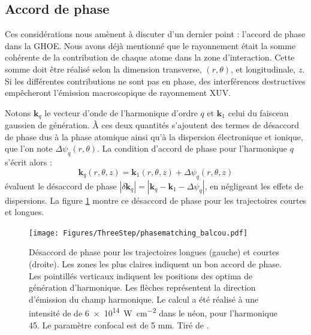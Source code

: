 \subsection{Accord de phase}
Ces considérations nous amènent à discuter d'un dernier point : l'accord de phase dans la GHOE. Nous avons déjà mentionné que le rayonnement était la somme cohérente de la contribution de chaque atome dans la zone d'interaction. Cette somme doit être réalisé selon la dimension transverse, $(r,\theta)$, et longitudinale, $z$. Si les différentes contributions ne sont pas en phase, des interférences destructives empêcheront l'émission macroscopique de rayonnement XUV.

Notons $\bm{k}_q$ le vecteur d'onde de l'harmonique d'ordre $q$ et $\bm{k}_1$ celui du faisceau gaussien de génération. \`A ces deux quantités s'ajoutent des termes de désaccord de phase dus à la phase atomique ainsi qu'à la dispersion électronique et ionique, que l'on note $\Delta \psi_q(r,\theta)$. La condition d'accord de phase pour l'harmonique $q$ s'écrit alors  :
\begin{equation}
\bm{k}_q(r,\theta,z) = \bm{k}_1(r,\theta,z) + \Delta \psi_q(r,\theta,z)
\end{equation}
 évaluent le désaccord de phase $|\delta \bm{k}_q| = |\bm{k}_q-\bm{k}_1 - \Delta \psi_q|$, en négligeant les effets de dispersions. La figure \ref{fig:balcou} montre ce désaccord de phase pour les trajectoires courtes et longues. 

\begin{figure}[!ht]
\centering
\texttt{[image: Figures/ThreeStep/phasematching\_balcou.pdf]}%
\caption{Désaccord de phase pour les trajectoires longues (gauche) et courtes (droite). Les zones les plus claires indiquent un bon accord de phase. Les pointillés verticaux indiquent les positions des optima de génération d'harmonique. Les flèches représentent la direction d'émission du champ harmonique. Le calcul a été réalisé à une intensité de de \SI{6e14}{\W\per\cm\squared} dans le néon, pour l'harmonique 45. Le paramètre confocal est de 5 mm. Tiré de .}
\label{fig:balcou}
\end{figure}

